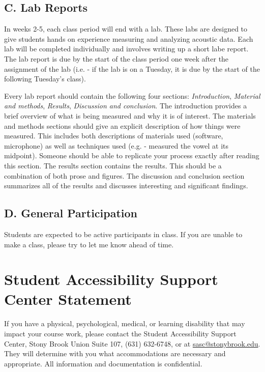 \documentclass[11pt]{article}
\begin{document}
\subsection*{C. Lab Reports}

In weeks 2-5, each class period will end with a lab.
These labs are designed to give students hands on experience measuring and analyzing acoustic data. 
Each lab will be completed individually and involves writing up a short labe report.
The lab report is due by the start of the class period one week after the assignment of the lab (i.e. - if the lab is on a Tuesday, it is due by the start of the following Tuesday's class).

Every lab report should contain the following four sections: \textit{Introduction}, \textit{Material and methods}, \textit{Results}, \textit{Discussion and conclusion}. 
The introduction provides a brief overview of what is being measured and why it is of interest. 
The materials and methods sections should give an explicit description of how things were measured.
This includes both descriptions of materials used (software, microphone) as well as techniques used (e.g. - measured the vowel at its midpoint).
Someone should be able to replicate your process exactly after reading this section.
The results section contains the results.
This should be a combination of both prose and figures.
The discussion and conclusion section summarizes all of the results and discusses interesting and significant findings.

\subsection*{D. General Participation}

Students are expected to be active participants in class.
If you are unable to make a class, please try to let me know ahead of time.


\section*{Student Accessibility Support Center Statement}

If you have a physical, psychological, medical, or learning disability that may impact your course work, please contact the Student Accessibility Support Center, Stony Brook Union Suite 107, (631) 632-6748, or at \href{mailto:sasc@stonybrook.edu}{sasc@stonybrook.edu}. They will determine with you what accommodations are necessary and appropriate. All information and documentation is confidential.
\end{document}
